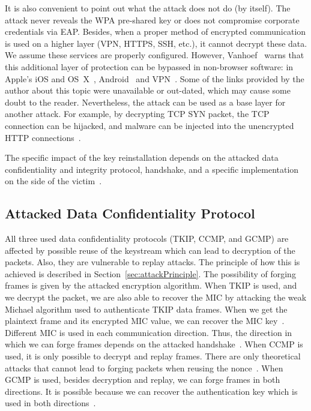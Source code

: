 It is also convenient to point out what the attack does not do (by itself). The attack never reveals the WPA pre-shared key or does not compromise corporate credentials via EAP. Besides, when a proper method of encrypted communication is used on a higher layer (VPN, HTTPS, SSH, etc.), it cannot decrypt these data. We assume these services are properly configured. However, Vanhoef~\cite{VA17} warns that this additional layer of protection can be bypassed in non-browser software: in Apple's iOS and OS~X~\cite{langley_2014}, Android~\cite{goodin_2015, Onwuzurike:2015:DMM:2766498.2766522} and VPN~\cite{goodin_2017}. Some of the links provided by the author about this topic were unavailable or out-dated, which may cause some doubt to the reader. Nevertheless, the attack can be used as a base layer for another attack. For example, by decrypting TCP SYN packet, the TCP connection can be hijacked, and malware can be injected into the unencrypted HTTP connections~\cite{VA17}.  

The specific impact of the key reinstallation depends on the attacked data confidentiality and integrity protocol, handshake, and a specific implementation on the side of the victim~\cite{VA_ccs2017}.

\subsection{Attacked Data Confidentiality Protocol}
All three used data confidentiality protocols (TKIP, CCMP, and GCMP) are affected by possible reuse of the keystream which can lead to decryption of the packets. Also, they are vulnerable to replay attacks. The principle of how this is achieved is described in Section~\ref{sec:attackPrinciple}. The possibility of forging frames is given by the attacked encryption algorithm.
When TKIP is used, and we decrypt the packet, we are also able to recover the MIC by attacking the weak Michael algorithm used to authenticate TKIP data frames. When we get the plaintext frame and its encrypted MIC value, we can recover the MIC key~\cite{MichaelIsWeak}. Different MIC is used in each communication direction. Thus, the direction in which we can forge frames depends on the attacked handshake~\cite{VA_ccs2017}.
When CCMP is used, it is only possible to decrypt and replay frames. There are only theoretical attacks that cannot lead to forging packets when reusing the nonce~\cite{ccmpTheoreticalAttacks}.
When GCMP is used, besides decryption and replay, we can forge frames in both directions. It is possible because we can recover the authentication key which is used in both directions~\cite{GCMFailure}.

